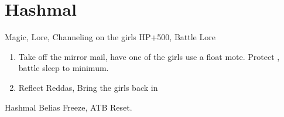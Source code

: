 \chapter{Hashmal}

\begin{liscense}
Magic, Lore, Channeling on the girls
\vaan HP+500, Battle Lore
\end{liscense}
\begin{enumerate}
\item Take off the mirror mail, have one of the girls use a float mote. Protect \vaan, battle sleep to minimum.
\item Reflect Reddas, Bring the girls back in
\end{enumerate}
\begin{gambit}
\begin{itemize}
\end{itemize}
\end{gambit}
\begin{battle}{Hashmal}
Belias Freeze, ATB Reset.
\end{battle}